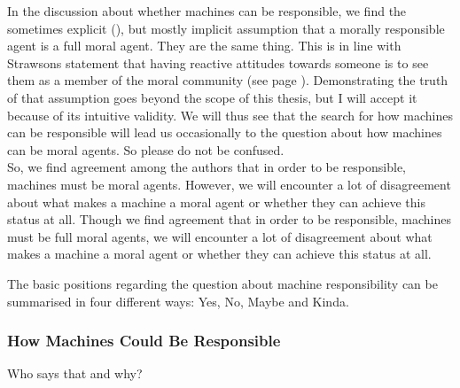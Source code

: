 \documentclass{article}
\begin{document}
In the discussion about whether machines can be responsible, we find the
sometimes explicit (\cite[p.  489]{SmithVickers2021}), but mostly implicit
assumption that a morally responsible agent is a full moral agent. They are
the same thing. This is in line with Strawsons statement that having reactive
attitudes towards someone is to see them as a member of the moral community
(see page \pageref{responsibility_implies_agency}). Demonstrating the truth of
that assumption goes beyond the scope of this thesis, but I will accept it
because of its intuitive validity. We will thus see that the search for how
machines can be responsible will lead us occasionally to the question about
how machines can be moral agents. So please do not be confused.\\
So, we find agreement among the authors that in order to be responsible,
machines must be moral agents. However, we will encounter a lot of disagreement
about what makes a machine a moral agent or whether they can achieve this status
at all.
Though we find agreement that in order to be responsible, machines must be full
moral agents, we will encounter a lot of disagreement about what makes a machine
a moral agent or whether they can achieve this status at all.

%


The basic positions regarding the question about machine responsibility can be
summarised in four different ways: Yes, No, Maybe and Kinda.

\subsubsection{How Machines Could Be Responsible}
Who says that and why?
\end{document}
